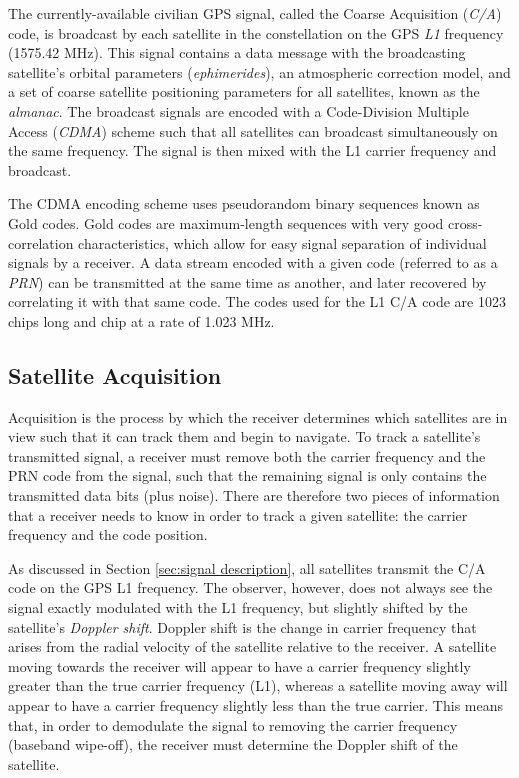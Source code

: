 \documentclass[12pt]{article}
\begin{document}
The currently-available civilian GPS signal, called the Coarse Acquisition (\emph{C/A}) code, is broadcast by each satellite in the constellation on the GPS \emph{L1} frequency (1575.42 MHz). This signal contains a data message with the broadcasting satellite's orbital parameters (\emph{ephimerides}), an atmospheric correction model, and a set of coarse satellite positioning parameters for all satellites, known as the \emph{almanac}. The broadcast signals are encoded with a Code-Division Multiple Access (\emph{CDMA}) scheme such that all satellites can broadcast simultaneously on the same frequency. The signal is then mixed with the L1 carrier frequency and broadcast.

The CDMA encoding scheme uses pseudorandom binary sequences known as Gold codes. Gold codes are maximum-length sequences with very good cross-correlation characteristics, which allow for easy signal separation of individual signals by a receiver. A data stream encoded with a given code (referred to as a \emph{PRN}) can be transmitted at the same time as another, and later recovered by correlating it with that same code. The codes used for the L1 C/A code are 1023 chips long and chip at a rate of 1.023 MHz.

\subsection{Satellite Acquisition}
\label{sec:acquisition}
Acquisition is the process by which the receiver determines which satellites are in view such that it can track them and begin to navigate. To track a satellite's transmitted signal, a receiver must remove both the carrier frequency and the PRN code from the signal, such that the remaining signal is only contains the transmitted data bits (plus noise). There are therefore two pieces of information that a receiver needs to know in order to track a given satellite: the carrier frequency and the code position.

As discussed in Section \ref{sec:signal description}, all satellites transmit the C/A code on the GPS L1 frequency. The observer, however, does not always see the signal exactly modulated with the L1 frequency, but slightly shifted by the satellite's \emph{Doppler shift}. Doppler shift is the change in carrier frequency that arises from the radial velocity of the satellite relative to the receiver. A satellite moving towards the receiver will appear to have a carrier frequency slightly greater than the true carrier frequency (L1), whereas a satellite moving away will appear to have a carrier frequency slightly less than the true carrier. This means that, in order to demodulate the signal to removing the carrier frequency (baseband wipe-off), the receiver must determine the Doppler shift of the satellite.
\end{document}
